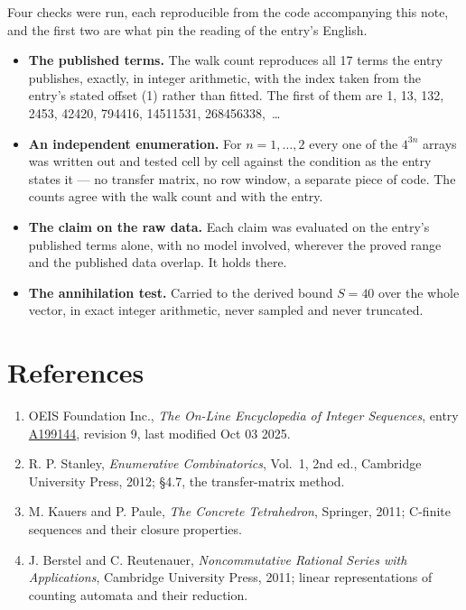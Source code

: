 \documentclass[11pt]{article}
\theoremstyle{definition}
\begin{document}
Four checks were run, each reproducible from the code accompanying this note, and the first two are what pin the reading of the entry's English.

\begin{itemize}

\item {\bfseries The published terms.} The walk count reproduces all 17 terms the entry publishes, exactly, in integer arithmetic, with the index taken from the entry's stated offset (1) rather than fitted. The first of them are 1, 13, 132, 2453, 42420, 794416, 14511531, 268456338,~\dots

\item {\bfseries An independent enumeration.} For $n = 1,\dots,2$ every one of the $4^{3n}$ arrays was written out and tested cell by cell against the condition as the entry states it --- no transfer matrix, no row window, a separate piece of code. The counts agree with the walk count and with the entry.

\item {\bfseries The claim on the raw data.} Each claim was evaluated on the entry's published terms alone, with no model involved, wherever the proved range and the published data overlap. It holds there.

\item {\bfseries The annihilation test.} Carried to the derived bound $S = 40$ over the whole vector, in exact integer arithmetic, never sampled and never truncated.

\end{itemize}

\section{References}

\begin{enumerate}

\item OEIS Foundation Inc., \emph{The On-Line Encyclopedia of Integer Sequences}, entry \href{https://oeis.org/A199144}{A199144}, revision 9, last modified Oct 03 2025.

\item R. P. Stanley, \emph{Enumerative Combinatorics}, Vol.~1, 2nd ed., Cambridge University Press, 2012; \S4.7, the transfer-matrix method.

\item M. Kauers and P. Paule, \emph{The Concrete Tetrahedron}, Springer, 2011; C-finite sequences and their closure properties.

\item J. Berstel and C. Reutenauer, \emph{Noncommutative Rational Series with Applications}, Cambridge University Press, 2011; linear representations of counting automata and their reduction.

\end{enumerate}
\end{document}
